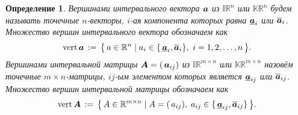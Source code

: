 \documentclass[a5paper,openany]{book}
\newcommand{\mbf}[1]{\protect\text{\boldmath$#1$}}
\newcommand{\mbb}{\mathbb}
\newcommand{\ov}{\overline}
\newcommand{\un}{\underline}
\renewcommand{\vert}{\mathrm{vert}\,}
\newtheorem{definition}{Определение}[section]
\begin{document}
\begin{definition}
\label{Vertices}
\textsl{Вершинами} интервального вектора $\mbf{a}$ из $\mbb{IR}^n$ или $\mbb{KR}^n$ 
будем называть точечные $n$-векторы, $i$-ая компонента которых равна $\un{\mbf{a}}_i$ 
или $\ov{\mbf{a}}_i$. Множество вершин интервального вектора обозначаем как 
\begin{equation*}
\vert\mbf{a} \, := \, \bigl\{\,a\in\mbb{R}^n \mid
a_i\in\{\,\un{\mbf{a}}_i,\ov{\mbf{a}}_i\},\ i=1,2,\ldots,n\,\bigr\}.
\end{equation*}
\textsl{Вершинами} интервальной матрицы $\mbf{A} = (\,\mbf{a}_{ij})$ 
из $\mbb{IR}^{m\times n}$ или $\mbb{KR}^{m\times n}$ назовём точечные 
$m\times n$-матрицы, $ij$-ым элементом которых является $\un{\mbf{a}}_{ij}$ 
или $\ov{\mbf{a}}_{ij}$. Множество вершин интервальной матрицы обозначаем как 
\begin{equation*}
\vert\mbf{A} \, := \, \bigl\{\,A\in\mbb{R}^{m\times n} \mid A = (\,a_{ij}),
\; a_{ij}\in\{\,\un{\mbf{a}}_{ij},\ov{\mbf{a}}_{ij}\}\,\bigr\}.
\end{equation*}
\end{definition} 
   
\end{document}
